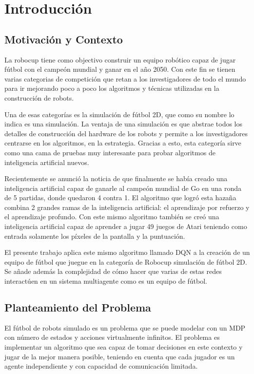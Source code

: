\chapter{Introducción}

\section{Motivación y Contexto}

La robocup tiene como objectivo construir un equipo robótico capaz de jugar fútbol con el campeón mundial y ganar en el año 2050. Con este fin se tienen varias categorias de competición que retan a los investigadores de todo el mundo para ir mejorando poco a poco los algoritmos y técnicas utilizadas en la construcción de robots.

Una de esas categorías es la simulación de fútbol 2D, que como su nombre lo indica es una simulación. La ventaja de una simulación es que abstrae todos los detalles de construcción del hardware de los robots y permite a los investigadores centrarse en los algoritmos, en la estrategia. Gracias a esto, esta categoría sirve como una cama de pruebas muy interesante para probar algoritmos de inteligencia artificial nuevos.

Recientemente se anunció la noticia de que finalmente se había creado una inteligencia artificial capaz de ganarle al campeón mundial de Go en una ronda de 5 partidas, donde quedaron 4 contra 1. El algoritmo que logró esta hazaña combina 2 grandes ramas de la inteligencia artificial: el aprendizaje por refuerzo y el aprendizaje profundo. Con este mismo algoritmo también se creó una inteligencia artificial capaz de aprender a jugar 49 juegos de Atari teniendo como entrada solamente los píxeles de la pantalla y la puntuación.

El presente trabajo aplica este mismo algoritmo llamado \ac{DQN} a la creación de un equipo de fútbol que juegue en la categoría de Robocup simulación de fútbol 2D. Se añade además la complejidad de cómo hacer que varias de estas redes interactúen en un sistema multiagente como es un equipo de fútbol.


\section{Planteamiento del Problema}

El fútbol de robots simulado es un problema que se puede modelar con un \ac{MDP} con número de estados y acciones virtualmente infinitos. El problema es implementar un algoritmo que sea capaz de tomar decisiones en este contexto y jugar de la mejor manera posible, teniendo en cuenta que cada jugador es un agente independiente y con capacidad de comunicación limitada.


